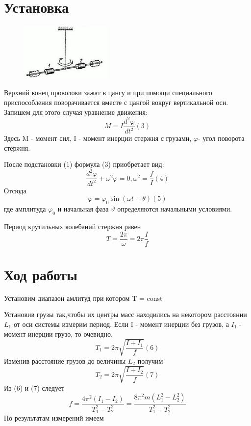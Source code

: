 \documentclass[a4paper]{article}
\begin{document}
\section{Установка}
\begin{figure}
    \centering
    \includegraphics[width=0.4\textwidth]{pick1.jpg}
\end{figure}
Верхний конец проволоки зажат в цангу и при помощи специального приспособления поворачивается вместе с цангой вокруг вертикальной оси. Запишем для этого случая уравнение движения:
\[M = I\frac{d^2\varphi }{dt^2}(3)\] 
Здесь M - момент сил, I - момент инерции стержня с грузами, $\varphi $- угол поворота стержня. \par
После подстановки (1) формула (3) приобретает вид:
\[\frac{d^2\varphi }{dt^2} + \omega^2\varphi = 0, \omega^2 = \frac{f}{I}(4)\] 
Отсюда 
\[\varphi = \varphi_{0}\sin(\omega t+\theta )(5)\]
где амплитуда $\varphi_{0}$ и начальная фаза  $\vartheta $ определяются начальными условиями.\par
Период крутильных колебаний стержня равен
\[T = \frac{2\pi }{\omega } =2\pi \frac{I}{f}\]  

\section{Ход работы}
Установим диапазон амлитуд при котором T = const\par
Установив грузы так,чтобы их центры масс находились на некотором расстоянии $L_{1}$ от оси системы измерим период.
Если I - момент инерции без грузов, а $I_{1}$ - момент инерции грузо, то очевидно,
\[T_{1} = 2\pi \sqrt{\frac{I+I_{1}}{f} }(6)\]
Изменив расстояние грузов до величины $L_{2}$ получим
\[T_{2} = 2\pi \sqrt{\frac{I+I_{2}}{f} }(7)\]
Из (6) и (7) следует 
\[f=\frac{4\pi^2(I_{1}-I_{2})}{T_{1}^2-T_{2}^2 }= \frac{8\pi^2m(L_{1}^2-L_{2}^2)}{T_{1}^2-T_{2}^2} \]
По результатам измерений имеем
\end{document}
